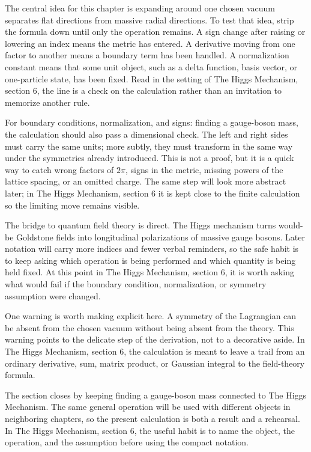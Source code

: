 The central idea for this chapter is expanding around one chosen vacuum separates flat directions from massive radial directions.  To test that idea, strip the formula down until only the operation remains.  A sign change after raising or lowering an index means the metric has entered.  A derivative moving from one factor to another means a boundary term has been handled.  A normalization constant means that some unit object, such as a delta function, basis vector, or one-particle state, has been fixed.  Read in the setting of The Higgs Mechanism, section 6, the line is a check on the calculation rather than an invitation to memorize another rule.

For boundary conditions, normalization, and signs: finding a gauge-boson mass, the calculation should also pass a dimensional check.  The left and right sides must carry the same units; more subtly, they must transform in the same way under the symmetries already introduced.  This is not a proof, but it is a quick way to catch wrong factors of \(2\pi\), signs in the metric, missing powers of the lattice spacing, or an omitted charge.  The same step will look more abstract later; in The Higgs Mechanism, section 6 it is kept close to the finite calculation so the limiting move remains visible.

The bridge to quantum field theory is direct.  The Higgs mechanism turns would-be Goldstone fields into longitudinal polarizations of massive gauge bosons.  Later notation will carry more indices and fewer verbal reminders, so the safe habit is to keep asking which operation is being performed and which quantity is being held fixed.  At this point in The Higgs Mechanism, section 6, it is worth asking what would fail if the boundary condition, normalization, or symmetry assumption were changed.

One warning is worth making explicit here.  A symmetry of the Lagrangian can be absent from the chosen vacuum without being absent from the theory.  This warning points to the delicate step of the derivation, not to a decorative aside.  In The Higgs Mechanism, section 6, the calculation is meant to leave a trail from an ordinary derivative, sum, matrix product, or Gaussian integral to the field-theory formula.

The section closes by keeping finding a gauge-boson mass connected to The Higgs Mechanism.  The same general operation will be used with different objects in neighboring chapters, so the present calculation is both a result and a rehearsal.  In The Higgs Mechanism, section 6, the useful habit is to name the object, the operation, and the assumption before using the compact notation.




